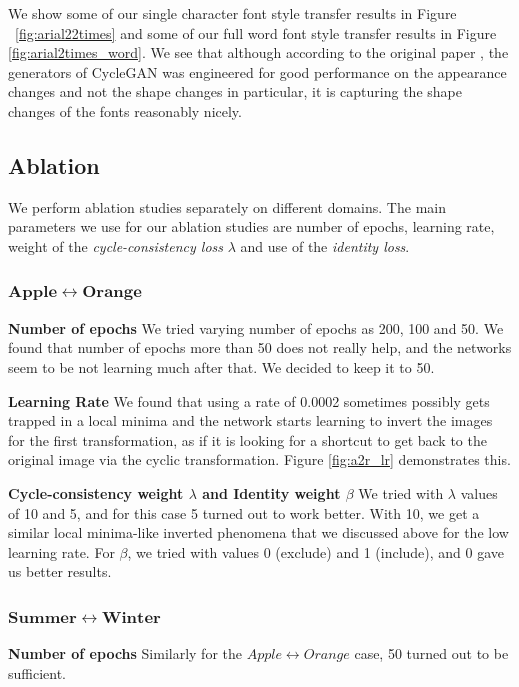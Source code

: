 \documentclass[10pt,twocolumn,letterpaper]{article}
\begin{document}
We show some of our single character font style transfer results in Figure \
\ref{fig:arial22times} and some of our full word font style transfer results in
Figure \ref{fig:arial2times_word}. We see that although according to the original paper 
\cite{cyclegan}, the generators of CycleGAN was engineered for good performance on the appearance changes and not the shape changes in particular, it is capturing the shape changes of the fonts reasonably nicely. 

\subsection{Ablation}
We perform ablation studies separately on different domains. The main parameters we use for our ablation studies are number of epochs, learning rate, weight of the \textit{cycle-consistency loss} $\lambda$ and use of the \textit{identity loss}.

\subsubsection{$\mathbf{Apple \leftrightarrow Orange}$}
\noindent\textbf{Number of epochs} We tried varying number of epochs as 200, 100 and 50. We found that number of epochs more than 
50 does not really help, and the networks seem to be not learning much after that. We decided to keep it to 50. 

\noindent\textbf{Learning Rate} We found that using a rate of 0.0002 sometimes possibly gets trapped in a local minima and the network starts learning to invert the images for the first transformation, as if it is looking for a shortcut to get back to the original image via the cyclic transformation. Figure \ref{fig:a2r_lr} demonstrates this.

\noindent\textbf{Cycle-consistency weight $\lambda$ and Identity weight $\beta$} We tried with $\lambda$
values of 10 and 5, and for this case 5 turned out to work better. With 10, we get a similar local minima-like inverted phenomena that we discussed above for the low learning rate. For $\beta$, we tried 
with values 0 (exclude) and 1 (include), and 0 gave us better results.

\subsubsection{$\mathbf{Summer \leftrightarrow Winter}$}
\noindent\textbf{Number of epochs} Similarly for the $Apple \leftrightarrow Orange$ case, 50 turned out to be sufficient.
\end{document}
